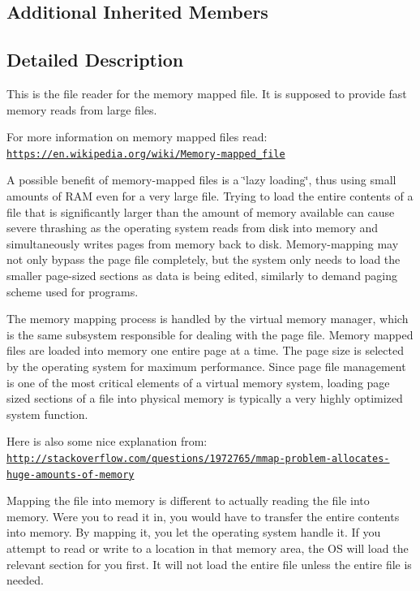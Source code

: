 \subsection*{Additional Inherited Members}


\subsection{Detailed Description}
This is the file reader for the memory mapped file. It is supposed to provide fast memory reads from large files.

For more information on memory mapped files read\+: \href{https://en.wikipedia.org/wiki/Memory-mapped_file}{\tt https\+://en.\+wikipedia.\+org/wiki/\+Memory-\/mapped\+\_\+file}

A possible benefit of memory-\/mapped files is a \char`\"{}lazy loading\char`\"{}, thus using small amounts of R\+A\+M even for a very large file. Trying to load the entire contents of a file that is significantly larger than the amount of memory available can cause severe thrashing as the operating system reads from disk into memory and simultaneously writes pages from memory back to disk. Memory-\/mapping may not only bypass the page file completely, but the system only needs to load the smaller page-\/sized sections as data is being edited, similarly to demand paging scheme used for programs.

The memory mapping process is handled by the virtual memory manager, which is the same subsystem responsible for dealing with the page file. Memory mapped files are loaded into memory one entire page at a time. The page size is selected by the operating system for maximum performance. Since page file management is one of the most critical elements of a virtual memory system, loading page sized sections of a file into physical memory is typically a very highly optimized system function.

Here is also some nice explanation from\+: \href{http://stackoverflow.com/questions/1972765/mmap-problem-allocates-huge-amounts-of-memory}{\tt http\+://stackoverflow.\+com/questions/1972765/mmap-\/problem-\/allocates-\/huge-\/amounts-\/of-\/memory}

Mapping the file into memory is different to actually reading the file into memory. Were you to read it in, you would have to transfer the entire contents into memory. By mapping it, you let the operating system handle it. If you attempt to read or write to a location in that memory area, the O\+S will load the relevant section for you first. It will not load the entire file unless the entire file is needed.

